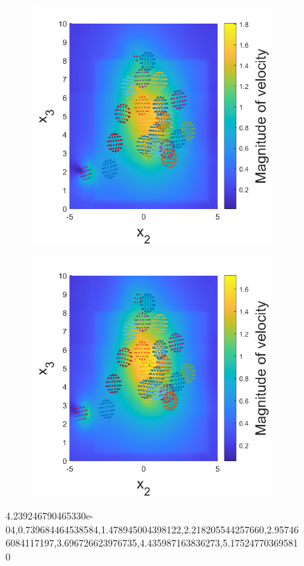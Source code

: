\begin{figure}
\begin{subfigure}[b]{0.24\textwidth}
    \caption[]{\label{fig:squirmerF}}
\end{subfigure}
\begin{subfigure}[b]{0.24\textwidth}
    \centering
    \includegraphics[width=\textwidth]{Images/squirmers/Gyro-7.pdf}
    \caption[]{\label{fig:squirmerG}}
\end{subfigure}
\begin{subfigure}[b]{0.24\textwidth}
    \centering
    \includegraphics[width=\textwidth]{Images/squirmers/Gyro-8.pdf}
    \caption[]{\label{fig:squirmerH}}
\end{subfigure}
\label{fig:SquiremerGyro}
\caption{4.239246790465330e-04,0.739684464538584,1.478945004398122,2.218205544257660,2.957466084117197,3.696726623976735,4.435987163836273,5.175247703695810}
\end{figure}
